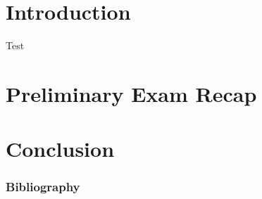 \documentclass[aspectratio=169,xcolor=dvipsnames]{beamer}
\begin{document}
  \frame\titlepage

  \section{Introduction}
  \begin{frame}
    Test
  \end{frame}

  \section{Preliminary Exam Recap}

  \section{}

  \section{}

  \section{Conclusion}

  \begin{frame}%
    \frametitle{Bibliography}
    \printbibliography[heading=none] %
  \end{frame}

  \appendix
\end{document}
